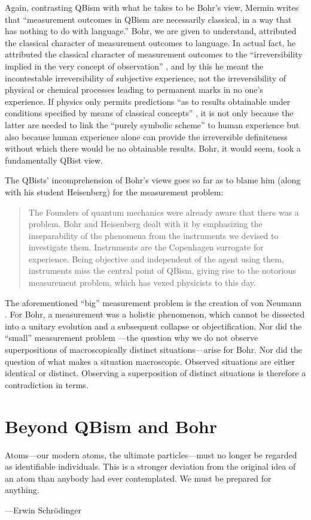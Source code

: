 \documentclass[12pt]{article}
\newcommand{\bq}{\begin{quote}}
\newcommand{\eq}{\end{quote}}
\begin{document}
Again, contrasting QBism with what he takes to be Bohr's view, Mermin writes that ``measurement outcomes in QBism are necessarily classical, in a way that has nothing to do with language.'' Bohr, we are given to understand, attributed the classical character of measurement outcomes to language. In actual fact, he attributed the classical character of measurement outcomes to the ``irreversibility implied in the very concept of observation'' \cite{BohrE58-62p92}, and by this he meant the incontestable irreversibility of subjective experience, not the irreversibility of physical or chemical processes leading to permanent marks in no one's experience. If physics only permits predictions ``as to results obtainable under conditions specified by means of classical concepts'' \cite{Bohr-APHKa}, it is not only because the latter are needed to link the ``purely symbolic scheme'' to human experience but also because human experience alone can provide the irreversible definiteness without which there would be no obtainable results. Bohr, it would seem, took a fundamentally QBist view.

The QBists' incomprehension of Bohr's views goes so far as to blame him (along with his student Heisenberg) for the measurement problem:
\bq
The Founders of quantum mechanics were already aware that there was a problem. Bohr and Heisenberg dealt with it by emphasizing the inseparability of the phenomena from the instruments we devised to investigate them. Instruments are the Copenhagen surrogate for experience. Being objective and independent of the agent using them, instruments miss the central point of QBism, giving rise to the notorious measurement problem, which has vexed physicists to this day. \cite{FMS2014}
\eq
The aforementioned ``big'' measurement problem is the creation of von Neumann \cite{vN}. For Bohr, a measurement was a holistic phenomenon, which cannot be dissected into a unitary evolution and a subsequent collapse or objectification. Nor did the ``small'' measurement problem \cite{Pitowsky2006}---the question why we do not observe superpositions of macroscopically distinct situations---arise for Bohr. Nor did the question of what makes a situation macroscopic.  Observed situations are either identical or distinct. Observing a superposition of distinct situations is therefore a contradiction in terms.


\section{Beyond QBism and Bohr}\label{sec.beyondQBB}
{\leftskip\parindent\small Atoms---our modern atoms, the ultimate particles---must no longer be regarded as identifiable individuals. This is a stronger deviation from the original idea of an atom than anybody had ever contemplated. We must be prepared for anything.\par\hfill---Erwin Schr\"odinger \cite{SchrNGSH}\par}\medskip
\end{document}
